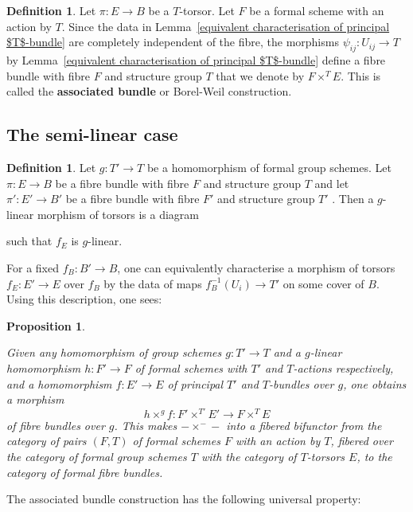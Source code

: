 \documentclass[10pt,oneside]{amsart}
\newtheorem{proposition}[theorem]{Proposition}
\theoremstyle{definition}
\newtheorem{definition}[theorem]{Definition}
\begin{document}
	\begin{definition} \label{definition of Borel construction}
		Let $\pi:E\rightarrow B$ be a $T$-torsor. Let $F$ be a formal scheme with an action by $T$. Since the data in Lemma~\ref{equivalent characterisation of principal $T$-bundle} are completely independent of the fibre, the morphisms $\psi_{ij}:U_{ij}\rightarrow T$ by Lemma~\ref{equivalent characterisation of principal $T$-bundle} define a fibre bundle with fibre $F$ and structure group $T$ that we denote by $F\times^T E$. This is called the \textbf{associated bundle} or Borel-Weil construction.
	\end{definition}
	\subsection{The semi-linear case}
	\begin{definition}
		Let $g:T'\rightarrow T$ be a homomorphism of formal group schemes. Let $\pi:E\rightarrow B$ be a fibre bundle with fibre $F$ and structure group $T$ and let $\pi':E'\rightarrow B'$ be a fibre bundle with fibre $F'$ and structure group $T'$ . Then a $g$-linear morphism of torsors is a diagram
		\begin{center}
		\end{center}		
		such that $f_E$ is $g$-linear.
	\end{definition}
	For a fixed $f_B:B'\rightarrow B$, one can equivalently characterise a morphism of torsors $f_E:E'\to E$ over $f_B$ by the data of maps $f_B^{-1}(U_i)\to T'$ on some cover of $B$. Using this description, one sees:
	\begin{proposition}\label{associated bundle construction in the semi-linear case is a sort of fibered bifunctor}
		
		Given any homomorphism of group schemes $g:T'\rightarrow T$ and a $g$-linear homomorphism $h:F'\rightarrow F$ of formal schemes with $T'$ and $T$-actions respectively, and a homomorphism $f:E'\rightarrow E$ of principal $T'$ and $T$-bundles over $g$, one obtains a morphism
		\[h\times^g f : F'\times^{T'}E'\rightarrow F\times^T E\]
		of fibre bundles over $g$. This makes $-\times^{-}-$ into a fibered bifunctor from the category of pairs $(F,T)$ of formal schemes $F$ with an action by $T$, fibered over the category of formal group schemes $T$ with the category of $T$-torsors $E$, to the category of formal fibre bundles.
	\end{proposition}
	The associated bundle construction has the following universal property:
	
\end{document}
